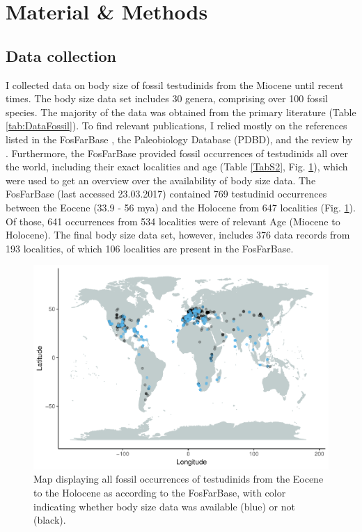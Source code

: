 \section{Material \& Methods}

\subsection{Data collection}
I collected data on body size of fossil testudinids from the Miocene until recent times. The body size data set includes 30 genera, comprising over 100 fossil species. The majority of the data was obtained from the primary literature (Table \ref{tab:DataFossil}). To find relevant publications, I relied mostly on the references listed in the FosFarBase \citep{Bohme2003b}, the Paleobiology Database (PDBD), and the review by \cite{rhodin2015turtles}.
Furthermore, the FosFarBase provided fossil occurrences of testudinids all over the world, including their exact localities and age (Table \ref{TabS2}, Fig. \ref{fig:mapOc}), which were used to get an overview over the availability of body size data. The FosFarBase (last accessed 23.03.2017) contained 769 testudinid occurrences between the Eocene (33.9 - 56 mya) and the Holocene from 647 localities (Fig. \ref{fig:mapOc}). Of those, 641 occurrences from 534 localities were of relevant Age (Miocene to Holocene). The final body size data set, however, includes 376 data records from 193 localities, of which 106 localities are present in the FosFarBase.


 \begin{figure}[htbp]
 	\centering
 	\includegraphics[width=\textwidth]{MA_JJ_files/figure-latex/MapFossilOccurrences-1.pdf}
 	\caption[Map: fossil occurences]{Map displaying all fossil occurrences of testudinids from the Eocene to the Holocene as according to the FosFarBase, with
 		color indicating whether body size data was available (blue) or not (black).}
 	\label{fig:mapOc}
 \end{figure}

